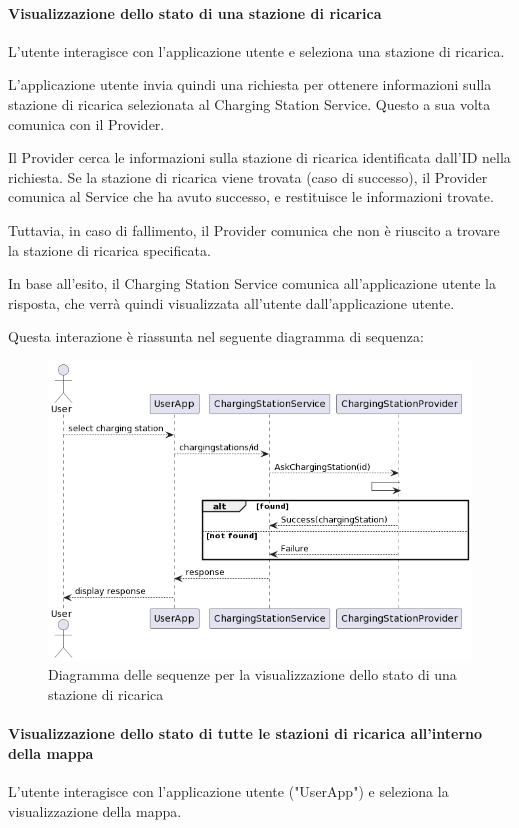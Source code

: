 \paragraph{Visualizzazione dello stato di una stazione di ricarica}
L'utente interagisce con l'applicazione utente e seleziona una stazione di ricarica.

L'applicazione utente invia quindi una richiesta per ottenere informazioni sulla stazione di ricarica selezionata al Charging Station Service. Questo a sua volta comunica con il Provider.

Il Provider cerca le informazioni sulla stazione di ricarica identificata dall'ID nella richiesta. Se la stazione di ricarica viene trovata (caso di successo), il Provider comunica al Service che ha avuto successo, e restituisce le informazioni trovate.

Tuttavia, in caso di fallimento, il Provider comunica che non è riuscito a trovare la stazione di ricarica specificata.

In base all'esito, il Charging Station Service comunica all'applicazione utente la risposta, che verrà quindi visualizzata all'utente dall'applicazione utente.

Questa interazione è riassunta nel seguente diagramma di sequenza:

\begin{figure}[htbp]
    \centering
    \includegraphics[width=\textwidth]{images/ask-station.png}
    \caption{Diagramma delle sequenze per la visualizzazione dello stato di una stazione di ricarica}
    \label{fig:ask-station}
\end{figure}

\paragraph{Visualizzazione dello stato di tutte le stazioni di ricarica all'interno della mappa}
L'utente interagisce con l'applicazione utente ("UserApp") e seleziona la visualizzazione della mappa.

